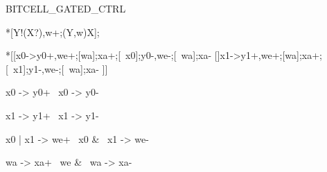 \documentclass{article}
\begin{document}
BITCELL\_GATED\_CTRL
\begin{csp}
*[Y!(X?),w+;(Y,w)\star\!X];
\end{csp}

\begin{hse}
*[[x0->y0+,we+;[wa];xa+;[~x0];y0-,we-;[~wa];xa-
  []x1->y1+,we+;[wa];xa+;[~x1];y1-,we-;[~wa];xa-
 ]]
\end{hse}

\begin{prs2}
x0 -> y0+
~x0 -> y0-

x1 -> y1+
~x1 -> y1-
\end{prs2}

\begin{prs2}
x0 | x1 -> we+
~x0 & ~x1 -> we-
\end{prs2}

\begin{prs2}
wa -> xa+
~we & ~wa -> xa-
\end{prs2}

\end{document}
